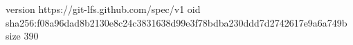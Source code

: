 version https://git-lfs.github.com/spec/v1
oid sha256:f08a96dad8b2130e8c24c3831638d99e3f78bdba230ddd7d2742617e9a6a749b
size 390
